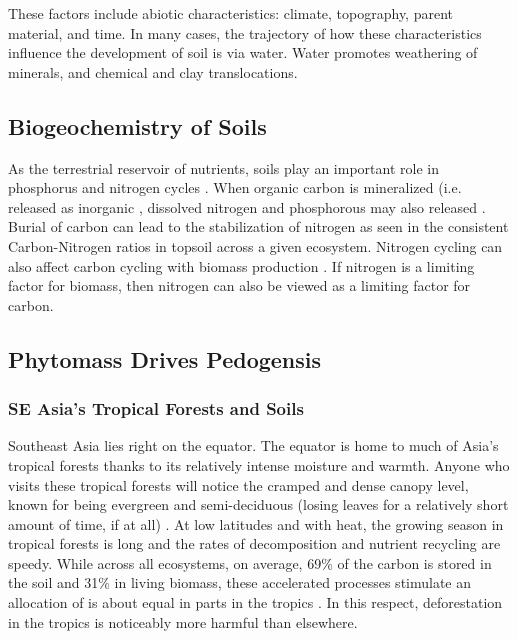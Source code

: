 These factors include abiotic characteristics: climate, topography, parent material, and time. In many cases, the trajectory of how these characteristics influence the development of soil is via water. Water promotes weathering of minerals, and chemical and clay translocations. 

\subsection{Biogeochemistry of Soils}

As the terrestrial reservoir of nutrients, soils play an important role in phosphorus and nitrogen cycles \citep{van2007impact}. When organic carbon  is mineralized (i.e. released as inorganic \CO, dissolved nitrogen and phosphorous may also released \citep{jacinthe2002carbon}. Burial of carbon can lead to the stabilization of nitrogen as seen in the consistent Carbon-Nitrogen ratios in topsoil across a given ecosystem. Nitrogen cycling can also affect carbon cycling with biomass production \citep{van2006element}. If nitrogen is a limiting factor for biomass, then nitrogen can also be viewed as a limiting factor for carbon.

\subsection{Phytomass Drives Pedogensis}

\subsubsection{SE Asia's Tropical Forests and Soils}

Southeast Asia lies right on the equator. The equator is home to much of Asia's tropical forests thanks to its relatively intense moisture and warmth. Anyone who visits these tropical forests will notice the cramped and dense canopy level, known for being evergreen and semi-deciduous (losing leaves for a relatively short amount of time, if at all) \citep{lieth2012tropical}. At low latitudes and with heat, the growing season in tropical forests is long and the rates of decomposition and nutrient recycling are speedy. While across all ecosystems, on average, 69\% of the carbon is stored in the soil and 31\% in living biomass, these accelerated processes stimulate an allocation of is about equal in parts in the tropics \citep{dixon1994carbon}. In this respect, deforestation in the tropics is noticeably more harmful than elsewhere.

